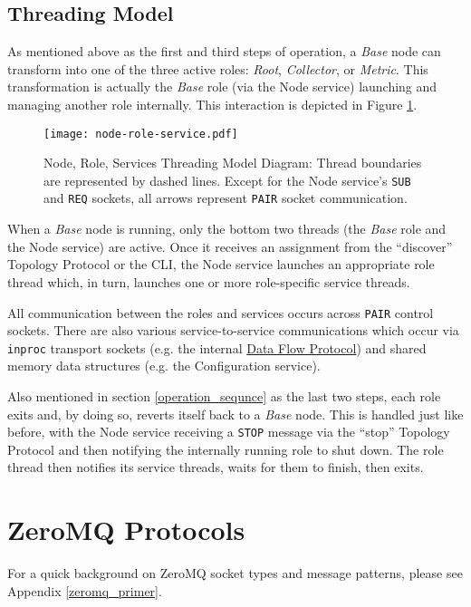 \subsection{Threading Model}
\label{threading_model}

As mentioned above as the first and third steps of \dcamp operation, a \textit{Base} node can transform into one of the
three active \dcamp roles: \textit{Root}, \textit{Collector}, or \textit{Metric}. This transformation is actually the
\textit{Base} role (via the Node service) launching and managing another role internally. This interaction is depicted
in Figure \ref{fig:node_role_service_image}.

\begin{figure}[H]
    \centering
    \texttt{[image: node-role-service.pdf]}
    \caption[Node, Role, Services Threading Model Diagram]
            {Node, Role, Services Threading Model Diagram: Thread boundaries are represented by dashed lines. Except for
	     the Node service's \texttt{SUB} and \texttt{REQ} sockets, all arrows represent \texttt{PAIR} socket
	     communication.}
    \label{fig:node_role_service_image}
\end{figure}

When a \textit{Base} node is running, only the bottom two threads (the \textit{Base} role and the Node service) are
active. Once it receives an assignment from the ``discover'' Topology Protocol or the \dcamp CLI, the Node service
launches an appropriate role thread which, in turn, launches one or more role-specific service threads.

All communication between the roles and services occurs across \texttt{PAIR} control sockets. There are also various
service-to-service communications which occur via \texttt{inproc} transport sockets (e.g. the internal
\hyperref[proto_data]{Data Flow Protocol}) and shared memory data structures (e.g. the Configuration service).

Also mentioned in section \ref{operation_sequnce} as the last two steps, each role exits and, by doing so, reverts
itself back to a \textit{Base} node. This is handled just like before, with the Node service receiving a \texttt{STOP}
message via the ``stop'' Topology Protocol and then notifying the internally running role to shut down. The role thread
then notifies its service threads, waits for them to finish, then exits.

\section{ZeroMQ Protocols}

For a quick background on ZeroMQ socket types and message patterns, please see Appendix \ref{zeromq_primer}.






